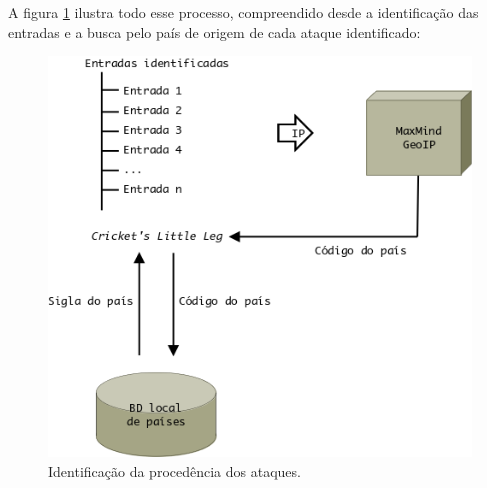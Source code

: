 A figura \ref{figura:ws-geoip} ilustra todo esse processo, compreendido desde a identificação das entradas e a busca pelo país de origem de cada ataque identificado:

\begin{figure}[h]
    \begin{center}
        \includegraphics[scale=0.5]{./figuras/ws-geoip.png}

        \caption{\label{figura:ws-geoip}Identificação da procedência dos ataques.}
    \end{center}
\end{figure}
